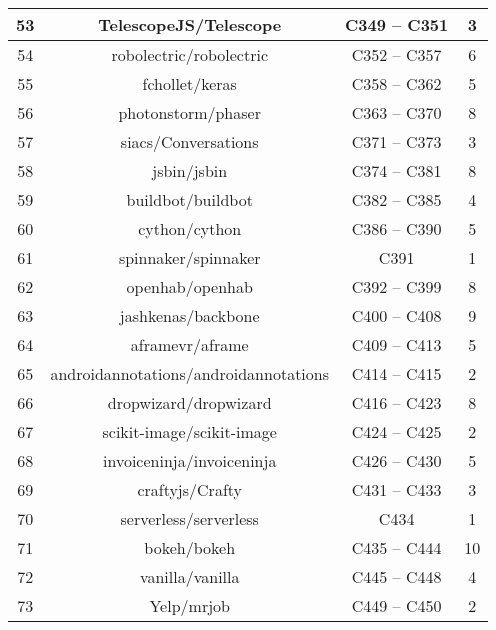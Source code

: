 \begin{appendices}
\begin{table}[H]
\begin{tabular}{|c|c|c|c|}
		\hline
		53    & TelescopeJS/Telescope & C349 -- C351 & 3 \bigstrut\\
		\hline
		54    & robolectric/robolectric & C352 -- C357 & 6 \bigstrut\\
		\hline
		55    & fchollet/keras & C358 -- C362 & 5 \bigstrut\\
		\hline
		56    & photonstorm/phaser & C363 -- C370 & 8 \bigstrut\\
		\hline
		57    & siacs/Conversations & C371 -- C373 & 3 \bigstrut\\
		\hline
		58    & jsbin/jsbin & C374 -- C381 & 8 \bigstrut\\
		\hline
		59    & buildbot/buildbot & C382 -- C385 & 4 \bigstrut\\
		\hline
		60    & cython/cython & C386 -- C390 & 5 \bigstrut\\
		\hline
		61    & spinnaker/spinnaker & C391  & 1 \bigstrut\\
		\hline
		62    & openhab/openhab & C392 -- C399 & 8 \bigstrut\\
		\hline
		63    & jashkenas/backbone & C400 -- C408 & 9 \bigstrut\\
		\hline
		64    & aframevr/aframe & C409 -- C413 & 5 \bigstrut\\
		\hline
		65    & androidannotations/androidannotations & C414 -- C415 & 2 \bigstrut\\
		\hline
		66    & dropwizard/dropwizard & C416 -- C423 & 8 \bigstrut\\
		\hline
		67    & scikit-image/scikit-image & C424 -- C425 & 2 \bigstrut\\
		\hline
		68    & invoiceninja/invoiceninja & C426 -- C430 & 5 \bigstrut\\
		\hline
		69    & craftyjs/Crafty & C431 -- C433 & 3 \bigstrut\\
		\hline
		70    & serverless/serverless & C434  & 1 \bigstrut\\
		\hline
		71    & bokeh/bokeh & C435 -- C444 & 10 \bigstrut\\
		\hline
		72    & vanilla/vanilla & C445 -- C448 & 4 \bigstrut\\
		\hline
		73    & Yelp/mrjob & C449 -- C450 & 2 \bigstrut\\
		\hline
	\end{tabular}%
	\label{tab:participants_per_project_part_ii}%
\end{table}%
	


\end{appendices}